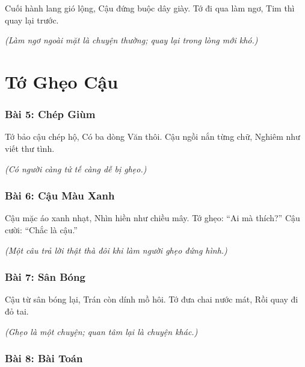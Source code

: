 \documentclass[14pt,a4paper,twoside]{extbook}
\begin{document}
Cuối hành lang gió lộng,
Cậu đứng buộc dây giày.
Tớ đi qua làm ngơ,
Tim thì quay lại trước.

\vspace{1.5cm}\noindent
\textit{(Làm ngơ ngoài mặt là chuyện thường; quay lại trong lòng mới khó.)}

\newpage

\part{Tớ Ghẹo Cậu}

\section*{Bài 5: Chép Giùm}

Tớ bảo cậu chép hộ,
Có ba dòng Văn thôi.
Cậu ngồi nắn từng chữ,
Nghiêm như viết thư tình.

\vspace{1.5cm}\noindent
\textit{(Có người càng tử tế càng dễ bị ghẹo.)}

\vspace{2cm}

\section*{Bài 6: Cậu Màu Xanh}

Cậu mặc áo xanh nhạt,
Nhìn hiền như chiều mây.
Tớ ghẹo: ``Ai mà thích?''
Cậu cười: ``Chắc là cậu.''

\vspace{1.5cm}\noindent
\textit{(Một câu trả lời thật thà đôi khi làm người ghẹo đứng hình.)}

\vspace{2cm}

\section*{Bài 7: Sân Bóng}

Cậu từ sân bóng lại,
Trán còn dính mồ hôi.
Tớ đưa chai nước mát,
Rồi quay đi đỏ tai.

\vspace{1.5cm}\noindent
\textit{(Ghẹo là một chuyện; quan tâm lại là chuyện khác.)}

\vspace{2cm}

\section*{Bài 8: Bài Toán}
\end{document}
